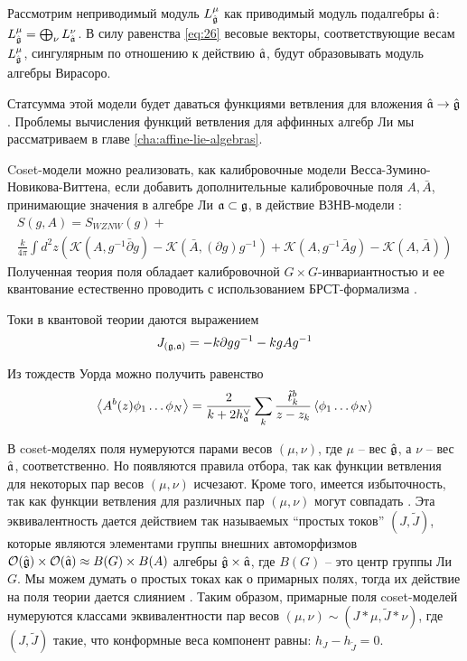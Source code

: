 Рассмотрим неприводимый модуль $L^{\mu}_{\hat{\mathfrak{g}}}$ как приводимый модуль подалгебры $\hat{\mathfrak{a}}$: $L^{\mu}_{\hat{\mathfrak{g}}}=\bigoplus_{\nu}L^{\nu}_{\hat{\mathfrak{a}}}$.  В силу  равенства \eqref{eq:26} весовые векторы, соответствующие весам $L^{\mu}_{\hat{\mathfrak{g}}}$, сингулярным по отношению к действию $\hat{\mathfrak{a}}$, будут образовывать модуль алгебры Вирасоро. 

Статсумма этой модели будет даваться функциями ветвления для вложения $\hat{\mathfrak{a}}\to\hat{\mathfrak{g}}$. Проблемы вычисления функций ветвления для аффинных алгебр Ли мы рассматриваем в главе \ref{cha:affine-lie-algebras}. 

Coset-модели можно реализовать, как калибровочные модели Весса-Зумино-Новикова-Виттена, если добавить дополнительные калибровочные поля  $A, \bar{A}$, принимающие значения в алгебре Ли $\mathfrak{a}\subset \mathfrak{g}$, в действие ВЗНВ-модели  \cite{gawdzki1988g}:
\begin{multline}
  \label{eq:38}
      S(g,A)=S_{WZNW}(g)+\\
      \frac{k}{4\pi}\int d^{2}z \left(\mathcal{K}(A, g^{-1}\bar \partial g)-\mathcal{K}(\bar A, (\partial g ) g^{-1})+\mathcal{K}(A,g^{-1}\bar A g)-\mathcal{K}(A,\bar A)\right)
\end{multline}
Полученная теория поля обладает калибровочной $G\times G$-инвариантностью  и ее квантование естественно проводить с использованием БРСТ-формализма \cite{hwang1993brst}. 

Токи в квантовой теории даются выражением
\begin{equation}
  \label{eq:39}
  J_{(\mathfrak{g},\mathfrak{a})}=-k\partial g g^{-1} -k g A g^{-1}
\end{equation}

Из тождеств Уорда можно получить равенство
\begin{equation*}
  \left< A^{b}(z)\phi_{1}\dots \phi_{N}\right>=\frac{2}{k+2 h^{\vee}_{\mathfrak{a}}}\sum_{k}\frac{\tilde{t}^{b}_{k}}{z-z_{k}}\left<\phi_{1}\dots \phi_{N}\right>
\end{equation*}

В coset-моделях поля нумеруются парами весов  $(\mu,\nu)$, где $\mu$ -- вес  $\hat{\mathfrak{g}}$, а $\nu$ -- вес $\hat{\mathfrak{a}}$, соответственно. Но появляются правила отбора, так как функции ветвления для некоторых пар весов  $(\mu,\nu)$ исчезают. Кроме того, имеется избыточность, так как функции ветвления для различных пар $(\mu,\nu)$ могут совпадать \cite{fuchs1996resolution,schellekens1990field}.  Эта эквивалентность дается действием так называемых ``простых токов'' $(J,\tilde{J})$, которые являются элементами группы внешних автоморфизмов  $\mathcal{O}(\hat{\mathfrak{g}})\times \mathcal{O}(\hat{\mathfrak{a}})\approx B(G)\times B(A)$ алгебры $\hat{\mathfrak{g}}\times\hat{\mathfrak{a}}$, где $B(G)$ -- это центр группы Ли $G$. Мы можем думать о простых токах как о примарных полях, тогда их действие на поля теории дается слиянием \cite{difrancesco1997cft}. Таким образом, примарные поля coset-моделей нумеруются классами эквивалентности пар весов  $(\mu,\nu)\sim (J*\mu,\tilde{J}*\nu)$, где $(J,\tilde J)$ такие, что  конформные веса компонент равны:  $h_{J}-h_{\tilde{J}}=0$.

